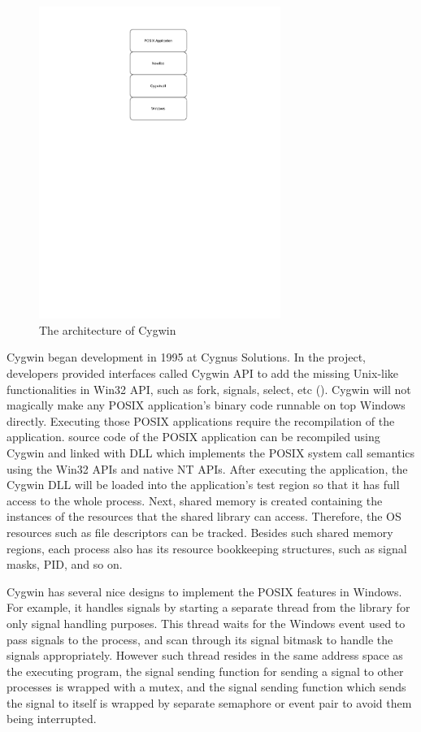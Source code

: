 \begin{figure}[htb]
    \centering
    \includegraphics[clip, trim=0.5cm 16cm 3cm 0.5cm, width=0.7\textwidth, height=0.7\textwidth]{ch2/Cyg-arch.pdf}
    \caption{The architecture of Cygwin}
    \label{fig:cyg}
\end{figure}

Cygwin began development in 1995 at Cygnus Solutions. In the project, developers provided interfaces called Cygwin API to add the missing Unix-like functionalities in Win32 API, such as fork, signals, select, etc (\cite{Cygwin}). Cygwin will not magically make any POSIX application's binary code runnable on top  Windows directly. Executing those POSIX applications require the recompilation of the application. source code of the POSIX application can be recompiled using Cygwin and linked with DLL which implements the POSIX system call semantics using the Win32 APIs and native NT APIs. After executing the application, the Cygwin DLL will be loaded into the application's test region so that it has full access to the whole process. Next, shared memory is created containing the instances of the resources that the shared library can access. Therefore, the OS resources such as file descriptors can be tracked. Besides such shared memory regions, each process also has its resource bookkeeping structures, such as signal masks, PID, and so on.

Cygwin has several nice designs to implement the POSIX features in Windows. For example, it handles signals by starting a separate thread from the library for only signal handling purposes. This thread waits for the Windows event used to pass signals to the process, and scan through its signal bitmask to handle the signals appropriately. However such thread resides in the same address space as the executing program, the signal sending function for sending a signal to other processes is wrapped with a mutex, and the signal sending function which sends the signal to itself is wrapped by separate semaphore or event pair to avoid them being interrupted. 

